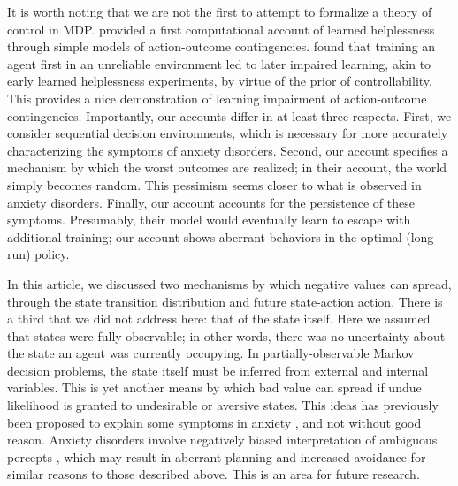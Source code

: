 \documentclass[11pt]{article} %
\begin{document}
It is worth noting that we are not the first to attempt to formalize a theory of control in MDP. \cite{HuysDayan2009} provided a first computational account of learned helplessness through simple models of action-outcome contingencies. \cite{HuysDayan2009} found that training an agent first in an unreliable environment led to later impaired learning, akin to early learned helplessness experiments, by virtue of the prior of controllability. This provides a nice demonstration of learning impairment of action-outcome contingencies. Importantly, our accounts differ in at least three respects. First, we consider sequential decision environments, which is necessary for more accurately characterizing the symptoms of anxiety disorders. Second, our account specifies a mechanism by which the worst outcomes are realized; in their account, the world simply becomes random. This pessimism seems closer to what is observed in anxiety disorders. Finally, our account accounts for the persistence of these symptoms. Presumably, their model would eventually learn to escape with additional training; our account shows aberrant behaviors in the optimal (long-run) policy.

In this article, we discussed two mechanisms by which negative values can spread, through the state transition distribution and future state-action action. There is a third that we did not address here: that of the state itself. Here we assumed that states were fully observable; in other words, there was no uncertainty about the state an agent was currently occupying. In partially-observable Markov decision problems, the state itself must be inferred from external and internal variables. This is yet another means by which bad value can spread if undue likelihood is granted to undesirable or aversive states. This ideas has previously been proposed to explain some symptoms in anxiety \citep{Paulus2012}, and not without good reason. Anxiety disorders involve negatively biased interpretation of ambiguous percepts \citep{Hartley2012}, which may result in aberrant planning and increased avoidance for similar reasons to those described above. This is an area for future research.
\end{document}
